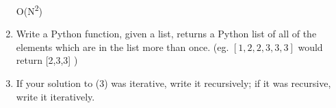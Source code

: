 \documentclass[11pt]{article}
\newenvironment{answer}{\large\lstset{basicstyle=\large}\color{white}}{}
\newenvironment{answer}{\large\lstset{basicstyle=\large}\color{red}}{}
\begin{document}
\begin{enumerate}
\begin{answer}
O(N\textsuperscript{2})
\end{answer}

\newpage
\item Write a Python function, given a list, returns a Python
    list of all of the elements which are in the list more than once. (eg.
    $[1, 2, 2, 3, 3, 3]$ would return [2,3,3] )
        \vspace{3in}
    \item If your solution to (3) was iterative, write it recursively; if it
    was recursive, write it iteratively.

 \end{enumerate}
\end{document}

